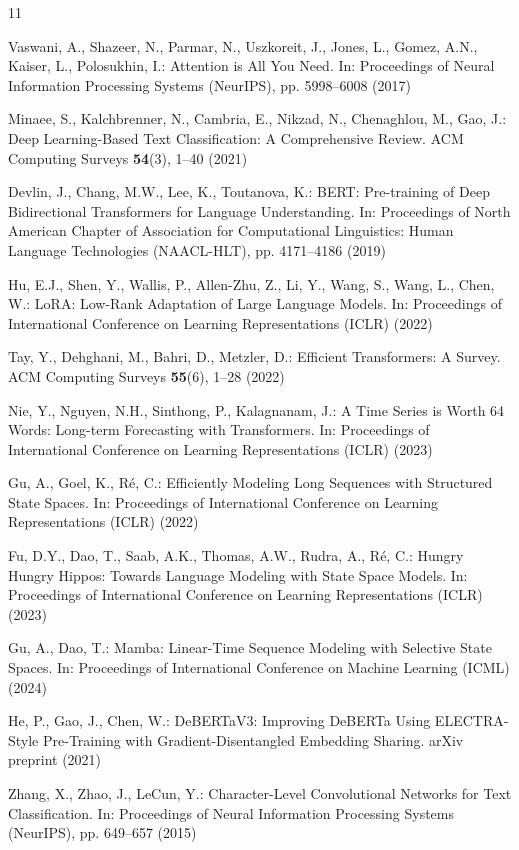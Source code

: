 \documentclass[runningheads]{llncs}
\begin{document}
\begin{thebibliography}{11}

Vaswani, A., Shazeer, N., Parmar, N., Uszkoreit, J., Jones, L., Gomez, A.N., Kaiser, L., Polosukhin, I.: Attention is All You Need. In: Proceedings of Neural Information Processing Systems (NeurIPS), pp. 5998--6008 (2017)

Minaee, S., Kalchbrenner, N., Cambria, E., Nikzad, N., Chenaghlou, M., Gao, J.: Deep Learning-Based Text Classification: A Comprehensive Review. ACM Computing Surveys \textbf{54}(3), 1--40 (2021)

Devlin, J., Chang, M.W., Lee, K., Toutanova, K.: BERT: Pre-training of Deep Bidirectional Transformers for Language Understanding. In: Proceedings of North American Chapter of Association for Computational Linguistics: Human Language Technologies (NAACL-HLT), pp. 4171--4186 (2019)

Hu, E.J., Shen, Y., Wallis, P., Allen-Zhu, Z., Li, Y., Wang, S., Wang, L., Chen, W.: LoRA: Low-Rank Adaptation of Large Language Models. In: Proceedings of International Conference on Learning Representations (ICLR) (2022)

Tay, Y., Dehghani, M., Bahri, D., Metzler, D.: Efficient Transformers: A Survey. ACM Computing Surveys \textbf{55}(6), 1--28 (2022)

Nie, Y., Nguyen, N.H., Sinthong, P., Kalagnanam, J.: A Time Series is Worth 64 Words: Long-term Forecasting with Transformers. In: Proceedings of International Conference on Learning Representations (ICLR) (2023)

Gu, A., Goel, K., Ré, C.: Efficiently Modeling Long Sequences with Structured State Spaces. In: Proceedings of International Conference on Learning Representations (ICLR) (2022)

Fu, D.Y., Dao, T., Saab, A.K., Thomas, A.W., Rudra, A., Ré, C.: Hungry Hungry Hippos: Towards Language Modeling with State Space Models. In: Proceedings of International Conference on Learning Representations (ICLR) (2023)

Gu, A., Dao, T.: Mamba: Linear-Time Sequence Modeling with Selective State Spaces. In: Proceedings of International Conference on Machine Learning (ICML) (2024)

He, P., Gao, J., Chen, W.: DeBERTaV3: Improving DeBERTa Using ELECTRA-Style Pre-Training with Gradient-Disentangled Embedding Sharing. arXiv preprint (2021)

Zhang, X., Zhao, J., LeCun, Y.: Character-Level Convolutional Networks for Text Classification. In: Proceedings of Neural Information Processing Systems (NeurIPS), pp. 649--657 (2015)

\end{thebibliography}
\end{document}
